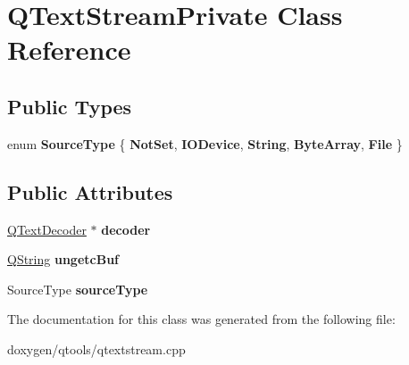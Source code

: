 \hypertarget{class_q_text_stream_private}{}\section{Q\+Text\+Stream\+Private Class Reference}
\label{class_q_text_stream_private}
\subsection*{Public Types}
\begin{DoxyCompactItemize}
\item 
\mbox{\label{class_q_text_stream_private_a3b6df983eaaeac7f2fd44fa4bc50dcb3}} 
enum {\bfseries Source\+Type} \{ \newline
{\bfseries Not\+Set}, 
{\bfseries I\+O\+Device}, 
{\bfseries String}, 
{\bfseries Byte\+Array}, 
\newline
{\bfseries File}
 \}
\end{DoxyCompactItemize}
\subsection*{Public Attributes}
\begin{DoxyCompactItemize}
\item 
\mbox{\label{class_q_text_stream_private_a26f177d9d556e804854965740c4897e8}} 
\mbox{\hyperlink{class_q_text_decoder}{Q\+Text\+Decoder}} $\ast$ {\bfseries decoder}
\item 
\mbox{\label{class_q_text_stream_private_a5657edc4d5707027c62d9ef391749a39}} 
\mbox{\hyperlink{class_q_string}{Q\+String}} {\bfseries ungetc\+Buf}
\item 
\mbox{\label{class_q_text_stream_private_ad36a4145a8b62bed2dbf661b1e5f8aa7}} 
Source\+Type {\bfseries source\+Type}
\end{DoxyCompactItemize}


The documentation for this class was generated from the following file\+:\begin{DoxyCompactItemize}
\item 
doxygen/qtools/qtextstream.\+cpp\end{DoxyCompactItemize}
